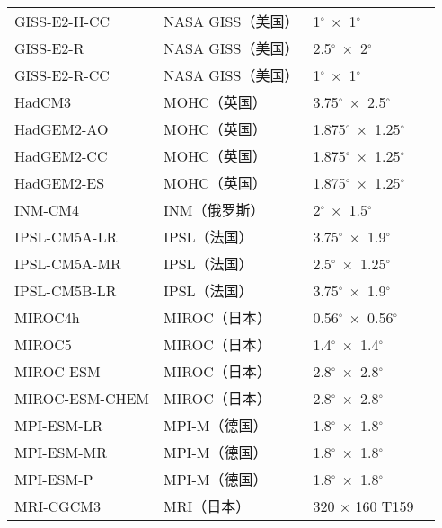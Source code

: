 \begin{table}[!t]
    \ContinuedFloat%
    \label{tab:descriptionGCM2}
    \centering
    \small%
    \setlength{\tabcolsep}{7 pt}%
    \renewcommand{\arraystretch}{1.0}%
     \begin{tabular}{llll}
        \hline 
        GISS-E2-H-CC &  NASA GISS（美国）& 1$^\circ ~ \times$ 1$^\circ$ & \citet{schmidt2014configuration} \\
        GISS-E2-R & NASA GISS（美国） & 2.5$^\circ ~ \times$ 2$^\circ$ & \citet{schmidt2014configuration} \\
        GISS-E2-R-CC & NASA GISS（美国）& 1$^\circ ~ \times$ 1$^\circ$ & \citet{schmidt2014configuration} \\
        HadCM3 & MOHC（英国）& 3.75$^\circ ~ \times$ 2.5$^\circ$ & \citet{johns2003anthropogenic} \\
        HadGEM2-AO & MOHC（英国）& 1.875$^\circ ~ \times$ 1.25$^\circ$ & \citet{collins2011development} \\
        HadGEM2-CC & MOHC（英国）& 1.875$^\circ ~ \times$ 1.25$^\circ$ & \citet{collins2011development} \\
        HadGEM2-ES & MOHC（英国）& 1.875$^\circ ~ \times$ 1.25$^\circ$ & \citet{collins2011development} \\
        INM-CM4 & INM（俄罗斯）& 2$^\circ ~ \times$ 1.5$^\circ$ & \citet{volodin2010simulating} \\
        IPSL-CM5A-LR & IPSL（法国）& 3.75$^\circ ~ \times$ 1.9$^\circ$ & \citet{dufresne2013climate} \\
        IPSL-CM5A-MR &  IPSL（法国）& 2.5$^\circ ~ \times$ 1.25$^\circ$ & \citet{dufresne2013climate} \\
        IPSL-CM5B-LR & IPSL（法国）& 3.75$^\circ ~ \times$ 1.9$^\circ$ & \citet{dufresne2013climate} \\
        MIROC4h & MIROC（日本）& 0.56$^\circ ~ \times$ 0.56$^\circ$ & \citet{sakamoto2012miroc4h} \\
        MIROC5 & MIROC（日本）& 1.4$^\circ ~ \times$ 1.4$^\circ$ & \citet{watanabe2010improved} \\
        MIROC-ESM & MIROC（日本）& 2.8$^\circ ~ \times$ 2.8$^\circ$ & \citet{watanabe2010improved} \\
        MIROC-ESM-CHEM & MIROC（日本）& 2.8$^\circ ~ \times$ 2.8$^\circ$ &  \citet{watanabe2010improved} \\
        MPI-ESM-LR & MPI-M（德国）& 1.8$^\circ ~ \times$ 1.8$^\circ$ & \citet{giorgetta2013climate} \\
        MPI-ESM-MR & MPI-M（德国）& 1.8$^\circ ~ \times$ 1.8$^\circ$ & \citet{giorgetta2013climate} \\
        MPI-ESM-P & MPI-M（德国）& 1.8$^\circ ~ \times$ 1.8$^\circ$ & \citet{giorgetta2013climate} \\
        MRI-CGCM3 & MRI（日本）& 320 $\times$ 160 T159 & \citet{yukimoto2012a} \\
        \hline
      \end{tabular}
\end{table}
    
